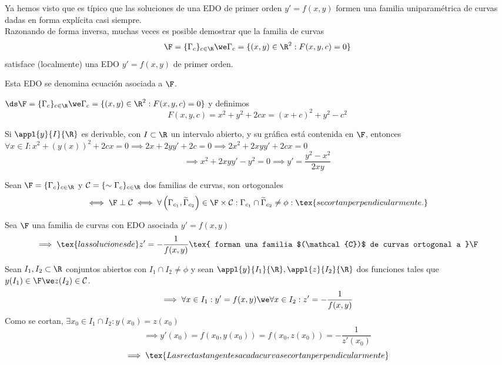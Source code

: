 Ya hemos visto que es típico que las soluciones de una EDO de primer orden $y'=f(x,y)$ formen una familia uniparamétrica de curvas dadas en forma explícita casi siempre. \\
\indent Razonando de forma inversa, muchas veces es posible demostrar que la familia de curvas
\[\F = \{\Gamma_c\}_{c\in \R} \we \Gamma_c=\{(x,y)\in \R^2:F(x,y,c)=0\}\]
satisface (localmente) una EDO $y'=f(x,y)$ de primer orden.
\begin{defn}
    Esta EDO se denomina ecuación asociada a $\F$.
\end{defn}

\begin{ejem} \label{circums}
    $\ds \F = \{\Gamma_c\}_{c\in \R} \we \Gamma_c=\{(x,y)\in \R^2:F(x,y,c)=0\}$ y definimos 
    \[F(x,y,c)=x^2+y^2+2cx=(x+c)^2+y^2-c^2\] \begin{figure}[htbp]
        \centering
        \vspace{-0.7cm} %
        
        \vspace{-0.2cm} %
    \end{figure}
    
    \noindent Si $\appl{y}{I}{\R}$ es derivable, con $I\subset\R$ un intervalo abierto, y su gráfica está contenida en $\F$, entonces $\forall x \in I : x^2+(y(x))^2+2cx=0 \implies 2x+2yy'+2c=0\implies 2x^2+2xyy'+2cx=0$
    \[\implies x^2+2xyy'-y^2=0 \implies y'=\frac{y^2-x^2}{2xy}\]
\end{ejem}

\begin{defn}
    Sean $\F=\{\Gamma_c\}_{c\in \R}$ y $\mathcal{C}=\{\sim{\Gamma_c}\}_{c\in \R}$ dos familias de curvas, son ortogonales
    \[\iff \F \perp \mathcal{C}\iff \forall \left(\Gamma_{c_1}, \widetilde{\Gamma}_{c_2}\right) \in \F\times\mathcal{C}: \Gamma_{c_1}\cap\widetilde{\Gamma}_{c_2}\ne \phi : \tex{se cortan perpendicularmente.}\]
\end{defn}

\begin{prop}
    Sea $\F$ una familia de curvas con EDO asociada $y'=f(x,y)$
    \[\implies \tex{las soluciones de } z'=-\frac{1}{f(x,y)} \tex{ forman una familia $(\mathcal{C})$ de curvas ortogonal a } \F\]
    \begin{dem}
        Sean $I_1, I_2 \subset \R$ conjuntos abiertos con $I_1\cap I_2\ne \phi$ y sean $\appl{y}{I_1}{\R}, \appl{z}{I_2}{\R}$ dos funciones tales que $y(I_1)\in \F \we z(I_2)\in \mathcal{C}$.
        \[\implies \forall x\in I_1 : y'=f(x,y) \we \forall x\in I_2 : z'=-\frac{1}{f(x,y)}\]
        Como se cortan, $\exists x_0\in I_1\cap I_2 : y(x_0)=z(x_0)$
        \[\implies y'(x_0)=f(x_0, y(x_0))=f(x_0, z(x_0))=-\frac{1}{z'(x_0)}\]
        \[\implies \tex{Las rectas tangentes a cada curva se cortan perpendicularmente}\]
    \end{dem}
\end{prop}

